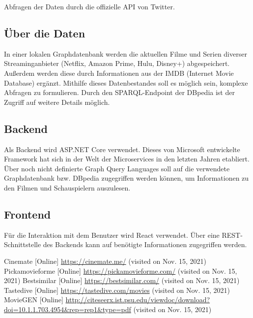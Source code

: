 \documentclass[conference]{IEEEtran}
\begin{document}
Abfragen der Daten durch die offizielle API von Twitter.

\subsection*{Über die Daten}

In einer lokalen Graphdatenbank werden die aktuellen Filme und Serien diverser Streaminganbieter (Netflix, Amazon Prime, Hulu, Disney+) abgespeichert. Außerdem werden diese durch Informationen aus der IMDB (Internet Movie Database) ergänzt. Mithilfe dieses Datenbestandes soll es möglich sein, komplexe Abfragen zu formulieren. Durch den SPARQL-Endpoint der DBpedia ist der Zugriff auf weitere Details möglich.

\subsection*{Backend}

Als Backend wird ASP.NET Core verwendet. Dieses von Microsoft entwickelte Framework hat sich in der Welt der Microservices in den letzten Jahren etabliert. Über noch nicht definierte Graph Query Languages soll auf die verwendete Graphdatenbank bzw. DBpedia zugegriffen werden können, um Informationen zu den Filmen und Schauspielern auszulesen.

\subsection*{Frontend}

Für die Interaktion mit dem Benutzer wird React verwendet. Über eine REST-Schnittstelle des Backends kann auf benötigte Informationen zugegriffen werden.


\begin{thebibliography}{0}
        Cinemate [Online] \url{https://cinemate.me/} (visited on Nov. 15, 2021)
        Pickamovieforme [Online] \url{https://pickamovieforme.com/} (visited on Nov. 15, 2021)
        Bestsimilar [Online] \url{https://bestsimilar.com/} (visited on Nov. 15, 2021)
        Tastedive [Online] \url{https://tastedive.com/movies} (visited on Nov. 15, 2021)
        MovieGEN [Online] \url{http://citeseerx.ist.psu.edu/viewdoc/download?doi=10.1.1.703.4954\&rep=rep1\&type=pdf} (visited on Nov. 15, 2021)
\end{thebibliography}
\vspace{12pt}
\end{document}
